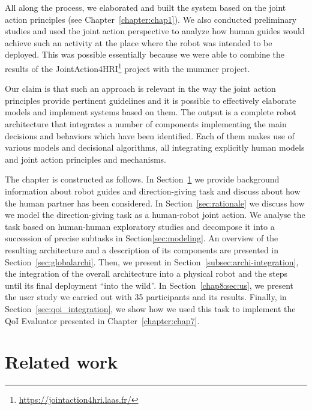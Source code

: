 \documentclass[a4paper,11pt,twoside]{StyleThese}
\begin{document}
All along the process, we elaborated and built the system based on the joint action principles (see Chapter~\ref{chapter:chap1}). We also conducted preliminary studies and used the joint action perspective to analyze how human guides would achieve such an activity at the place where the robot was intended to be deployed. This was possible essentially because we were able to combine the results of the JointAction4HRI\footnote{\url{https://jointaction4hri.laas.fr/}} project with the \acrshort{mummer} project.

Our claim is that such an approach is relevant in the way the joint action principles provide pertinent guidelines and it is possible to effectively elaborate models and implement systems based on them. 
The output is a complete robot architecture that integrates a number of components implementing the main decisions and behaviors which have been identified. Each of them makes use of various models and decisional algorithms, all integrating explicitly human models and joint action principles and mechanisms.


The chapter is constructed as follows. In Section~\ref{sec:related-work} we provide background information about robot guides and direction-giving task and discuss about how the human partner has been considered. In Section~\ref{sec:rationale} we discuss how we model the direction-giving task as a human-robot joint action. We analyse the task based on human-human exploratory studies and decompose it into a succession of precise subtasks in Section\ref{sec:modeling}. An overview of the resulting architecture and a description of its components are presented in Section~\ref{sec:globalarchi}. Then, we present in Section~\ref{subsec:archi-integration}, the integration of the overall architecture into a physical robot and the steps until its final deployment ``into the wild''. In Section~\ref{chap8:sec:us}, we present the user study we carried out with 35 participants and its results. Finally, in Section~\ref{sec:qoi_integration}, we show how we used this task to implement the QoI Evaluator presented in Chapter~\ref{chapter:chap7}. 


\section{Related work}
\label{sec:related-work}
\end{document}
